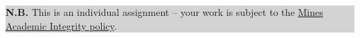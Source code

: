 
\def\graybox#1{
  \begin{center}
    \colorbox{LightGray}
    {\begin{minipage}{0.95\columnwidth} {#1} \end{minipage}}
  \end{center}
}

\def\nbnote#1{
\graybox{ \textbf{N.B.} #1 }
}

\nbnote{This is an individual assignment -- your work is subject to
  the
  \href{http://3a2vzv37nkuw3esf6a3u2t7s-wpengine.netdna-ssl.com/policy-library/wp-content/uploads/sites/87/2018/04/STU_Academic_Integrity_final-2018.pdf}{Mines
    Academic Integrity policy}.}
